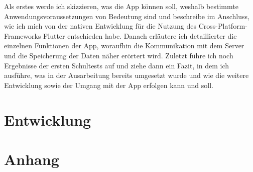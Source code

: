 \documentclass[12pt]{article}
\begin{document}
    Als erstes werde ich skizzieren, was die App können soll, weshalb bestimmte 
    Anwendungsvoraussetzungen von Bedeutung sind und beschreibe im Anschluss, wie
    ich mich von der nativen Entwicklung für die Nutzung des Cross-Platform-Frameworks 
    Flutter entschieden habe.
    Danach erläutere ich detaillierter die einzelnen Funktionen der App, woraufhin die 
    Kommunikation mit dem Server und die Speicherung der Daten näher erörtert wird. 
    Zuletzt führe ich noch Ergebnisse der ersten Schultests auf und ziehe dann ein Fazit,
    in dem ich ausführe, was in der Ausarbeitung bereits umgesetzt wurde und wie die 
    weitere Entwicklung sowie der Umgang mit der App erfolgen kann und soll.




\section{Entwicklung}






\section{Anhang}
\listoffigures
\end{document}
